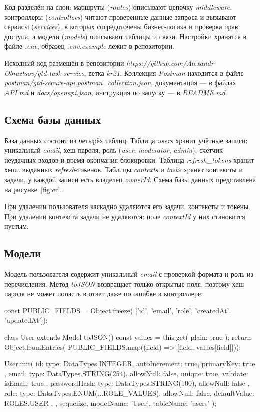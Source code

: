\documentclass{stp}
\newcommand{\en}[1]{\textit{#1}}
\begin{document}
Код разделён на слои: маршруты (\en{routes}) описывают цепочку
\en{middleware}, контроллеры (\en{controllers}) читают проверенные данные
запроса и вызывают сервисы (\en{services}), в которых сосредоточены
бизнес-логика и проверка прав доступа, а модели (\en{models}) описывают
таблицы и связи. Настройки хранятся в файле \en{.env}, образец
\en{.env.example} лежит в репозитории.

Исходный код размещён в репозитории
\en{https://github.com/\allowbreak{}Alexandr-Obraztsov/\allowbreak{}gtd-task-service},
ветка \en{kr21}. Коллекция \en{Postman} находится в файле
\en{postman/\allowbreak{}gtd-secure-api.postman\_collection.json}, документация
--- в файлах \en{API.md} и \en{docs/\allowbreak{}openapi.json}, инструкция по
запуску --- в \en{README.md}.

\subsection{Схема базы данных}

База данных состоит из четырёх таблиц. Таблица \en{users} хранит учётные
записи: уникальный \en{email}, хеш пароля, роль (\en{user}, \en{moderator},
\en{admin}), счётчик неудачных входов и время окончания блокировки. Таблица
\en{refresh\_tokens} хранит хеши выданных \en{refresh}-токенов. Таблицы
\en{contexts} и \en{tasks} хранят контексты и задачи, у каждой записи есть
владелец \en{ownerId}. Схема базы данных представлена на
рисунке~\ref{fig:er}.


При удалении пользователя каскадно удаляются его задачи, контексты и
токены. При удалении контекста задачи не удаляются: поле \en{contextId} у
них становится пустым.

\subsection{Модели}

Модель пользователя содержит уникальный \en{email} с проверкой формата и
роль из перечисления. Метод \en{toJSON} возвращает только открытые поля,
поэтому хеш пароля не может попасть в ответ даже по ошибке в контроллере:

\begin{stplisting}
const PUBLIC_FIELDS = Object.freeze(
  ['id', 'email', 'role', 'createdAt', 'updatedAt']);

class User extends Model {
  toJSON() {
    const values = this.get({ plain: true });
    return Object.fromEntries(
      PUBLIC_FIELDS.map((field) => [field, values[field]]));
  }
}

User.init({
  id: { type: DataTypes.INTEGER, autoIncrement: true,
    primaryKey: true },
  email: { type: DataTypes.STRING(254), allowNull: false,
    unique: true, validate: { isEmail: true } },
  passwordHash: { type: DataTypes.STRING(100),
    allowNull: false },
  role: { type: DataTypes.ENUM(...ROLE_VALUES),
    allowNull: false, defaultValue: ROLES.USER },
}, { sequelize, modelName: 'User', tableName: 'users' });
\end{stplisting}
\end{document}

